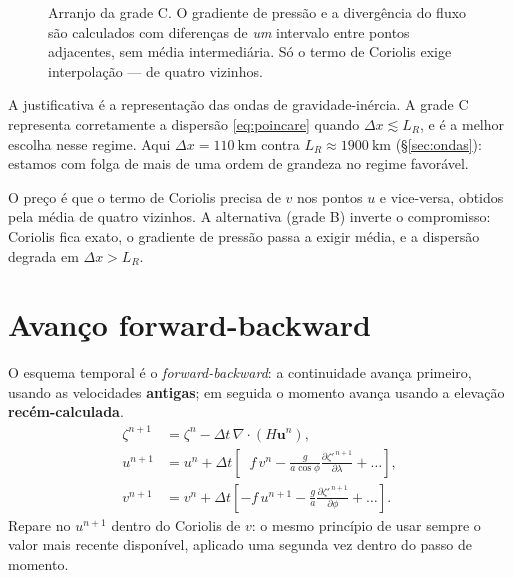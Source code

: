 \documentclass[11pt,a4paper,oneside]{report}
\theoremstyle{definition}
\theoremstyle{plain}
\theoremstyle{remark}
\newcommand{\vect}[1]{\bm{#1}}
\newcommand{\pd}[2]{\frac{\partial #1}{\partial #2}}
\begin{document}
\begin{figure}[htbp]
\centering
{}
\caption{Arranjo da grade C. O gradiente de pressão e a divergência do fluxo são
calculados com diferenças de \emph{um} intervalo entre pontos adjacentes, sem
média intermediária. Só o termo de Coriolis exige interpolação — de quatro
vizinhos.}
\label{fig:gradec}
\end{figure}

A justificativa é a representação das ondas de gravidade-inércia. A grade C
representa corretamente a dispersão \eqref{eq:poincare} quando
$\Delta x\lesssim L_R$, e é a melhor escolha nesse regime. Aqui
$\Delta x=\SI{110}{\kilo\meter}$ contra $L_R\approx\SI{1900}{\kilo\meter}$
(\S\ref{sec:ondas}): estamos com folga de mais de uma ordem de grandeza no
regime favorável.

O preço é que o termo de Coriolis precisa de $v$ nos pontos $u$ e vice-versa,
obtidos pela média de quatro vizinhos. A alternativa (grade B) inverte o
compromisso: Coriolis fica exato, o gradiente de pressão passa a exigir média, e
a dispersão degrada em $\Delta x>L_R$.

\section{Avanço forward-backward}
\label{sec:fb}

O esquema temporal é o \emph{forward-backward}: a continuidade avança primeiro,
usando as velocidades \textbf{antigas}; em seguida o momento avança usando a
elevação \textbf{recém-calculada}.
\begin{align}
\zeta^{n+1}&=\zeta^{n}-\Delta t\,\nabla\!\cdot\!(H\vect{u}^{n}),\\
u^{n+1}&=u^{n}+\Delta t\left[\;\;f\,v^{n}
  -\frac{g}{a\cos\phi}\pd{\zeta'^{\,n+1}}{\lambda}+\dots\right],\\
v^{n+1}&=v^{n}+\Delta t\left[-f\,u^{n+1}
  -\frac{g}{a}\pd{\zeta'^{\,n+1}}{\phi}+\dots\right].
\end{align}
Repare no $u^{n+1}$ dentro do Coriolis de $v$: o mesmo princípio de usar sempre
o valor mais recente disponível, aplicado uma segunda vez dentro do passo de
momento.
\end{document}
